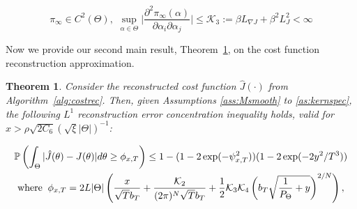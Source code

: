 \documentclass[journal,onecolumn]{IEEEtran}
\newtheorem{theorem}{Theorem}
\newcommand{\grad}{\nabla}
\newcommand{\rew}{J}
\newcommand{\PR}{\mathbb{P}}
\newcommand{\dimn}{N}
\newcommand{\gibbs}{\ids_{\infty}}
\newcommand{\del}{\partial}
\newcommand{\ids}{\pi}
\newcommand{\mk}{\mathcal{K}}
\newcommand{\lipJ}{L_J}
\newcommand{\lipGJ}{L_{\grad\rew}}
\newcommand{\wassprox}{\rho}
\newcommand{\kfv}{x} %
\newcommand{\zconst}{\xi}
\newcommand{\snum}{T}
\newcommand{\csix}{C_6}
\begin{document}
\begin{equation}
\label{eq:Vf}
\gibbs \in C^2(\Theta), \, \, \sup_{\alpha\in\Theta}\bigg|\frac{\del^2\gibbs(\alpha)}{\del\alpha_i\del\alpha_j}\bigg| \leq \mk_3 := \beta \lipGJ + \beta^2\lipJ^2 < \infty
\end{equation}


Now we provide our second main result, Theorem~\ref{thm:kernest}, on the cost function reconstruction approximation.

\begin{theorem}
\label{thm:kernest}
    Consider the reconstructed cost function $\hat{\rew}(\cdot)$ from Algorithm~\ref{alg:costrec}. Then, given Assumptions \ref{ass:Msmooth} to \ref{as:kernspec}, the following $L^1$ reconstruction error concentration inequality holds, valid for $\kfv > \wassprox\sqrt{ 2\csix}(\sqrt{\zconst}|\Theta|)^{-1}$:

    \begin{align}
     \begin{split}
     \label{eq:phidef}
        &\PR\left(\int_{\Theta}|\hat{J}(\theta) - J(\theta)|d\theta \geq  \phi_{\kfv,{\color{black}\snum }}\right) \leq 1 - (1 - 2\exp(-\psi_{\kfv,{\color{black}{\color{black}\snum }}}^2))(1-2\exp(-2y^2/T^3))\\
        &\text{ where} \;\;\phi_{\kfv,{\color{black}\snum }} = 2 L|\Theta|\left(\frac{\kfv}{\sqrt{{\color{black}\snum }}b_T} + \frac{\mk_2}{(2\pi)^{\dimn}\sqrt{{\color{black}\snum }}b_T} + \frac{1}{2}\mk_3\mk_4 \left(b_T\textcolor{black}{\sqrt{\frac{1}{P_{\Theta}}+y}}\right)^{2/\dimn} \right), \\

\end{split}
\end{align}
\end{theorem}
\end{document}
